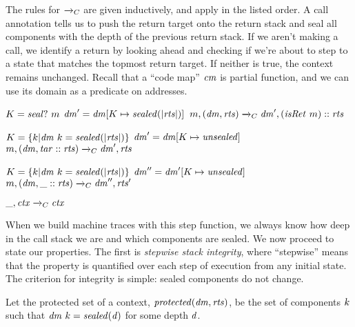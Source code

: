 \documentclass[acmsmall,review,anonymous]{acmart}\settopmatter{printfolios=true,printccs=false,printacmref=false}
\begin{document}
{The rules for \(\xrightarrow{}_C\) are given inductively, and apply in the listed order.
A call annotation tells us to push the return target onto the return stack and
seal all components with the depth of the previous return stack. If we aren't making a call,
we identify a return by looking ahead and checking if we're about to step to a state
that matches the topmost return target. If neither is true, the context remains unchanged.
Recall that a ``code map'' \(\mathit{cm}\) is partial function, and we can use its domain
as a predicate on addresses.

\judgmentthree[ Call]
              {\(\codemap ~ (\mach ~ \PCname)\)}
              {\(K = \mathit{seal?} ~ m\)}
              {\(\mathit{dm}' = \mathit{dm}[K \mapsto \mathit{sealed(|\mathit{rts}|)}]\)}
                {\(m,(\mathit{dm},\mathit{rts}) \xrightarrow{}_C \mathit{dm}',(\mathit{isRet} ~ m)::\mathit{rts}\)}

\vspace*{-1ex}
              {\(K = \{k | \mathit{dm} ~ k = \mathit{sealed(|\mathit{rts}|)}\}\)}
              {\(\mathit{dm}' = \mathit{dm}[K \mapsto \mathit{unsealed}]\)}
              {\(m,(\mathit{dm},\mathit{tar}::\mathit{rts}) \xrightarrow{}_C \mathit{dm}',\mathit{rts}\)}

\vspace*{-1ex}
              {\(K = \{k | \mathit{dm} ~ k = \mathit{sealed(|\mathit{rts}|)}\}\)}
              {\(\mathit{dm}'' = \mathit{dm}'[K \mapsto \mathit{unsealed}]\)}
              {\(m,(\mathit{dm},\mbox{\_}::\mathit{rts}) \xrightarrow{}_C \mathit{dm}'',\mathit{rts}'\)}

\vspace*{-3.5ex}
\judgment[ Default]
         {}
         {\(\mbox{\_},\mathit{ctx} \xrightarrow{}_C \mathit{ctx}\)}

When we build machine traces with this step function, we always know how deep in the
call stack we are and which components are sealed. We now proceed to state our properties.
The first is {\em stepwise stack integrity}, where ``stepwise'' means that the property is
quantified over each step of execution from any initial state. The criterion for integrity
is simple: sealed components do not change.

Let the protected set of a context, \(\mathit{protected}(\mathit{dm},\mathit{rts})\), be the
set of components \(k\) such that \(\mathit{dm} ~ k = \mathit{sealed(d)}\)
for some depth \(d\).

}
\end{document}
